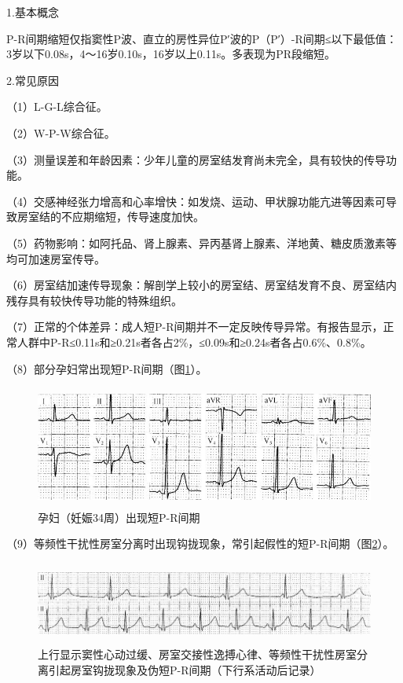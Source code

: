 1.基本概念

P-R间期缩短仅指窦性P波、直立的房性异位P′波的P（P′）-R间期≤以下最低值：3岁以下0.08s，4～16岁0.10s，16岁以上0.11s。多表现为PR段缩短。

2.常见原因

（1）L-G-L综合征。

（2）W-P-W综合征。

（3）测量误差和年龄因素：少年儿童的房室结发育尚未完全，具有较快的传导功能。

（4）交感神经张力增高和心率增快：如发烧、运动、甲状腺功能亢进等因素可导致房室结的不应期缩短，传导速度加快。

（5）药物影响：如阿托品、肾上腺素、异丙基肾上腺素、洋地黄、糖皮质激素等均可加速房室传导。

（6）房室结加速传导现象：解剖学上较小的房室结、房室结发育不良、房室结内残存具有较快传导功能的特殊组织。

（7）正常的个体差异：成人短P-R间期并不一定反映传导异常。有报告显示，正常人群中P-R≤0.11s和≥0.21s者各占2\%，≤0.09s和≥0.24s者各占0.6\%、0.8\%。

（8）部分孕妇常出现短P-R间期（图\ref{fig2-2}）。

\begin{figure}[!htbp]
 \centering
 \includegraphics[width=4.94792in,height=1.57292in]{./images/Image00037.jpg}
 \captionsetup{justification=centering}
 \caption{孕妇（妊娠34周）出现短P-R间期}
 \label{fig2-2}
  \end{figure} 

（9）等频性干扰性房室分离时出现钩拢现象，常引起假性的短P-R间期（图\ref{fig2-3}）。

\begin{figure}[!htbp]
 \centering
 \includegraphics[width=5.78125in,height=1.07292in]{./images/Image00038.jpg}
 \captionsetup{justification=centering}
 \caption{上行显示窦性心动过缓、房室交接性逸搏心律、等频性干扰性房室分离引起房室钩拢现象及伪短P-R间期（下行系活动后记录）}
 \label{fig2-3}
  \end{figure} 

